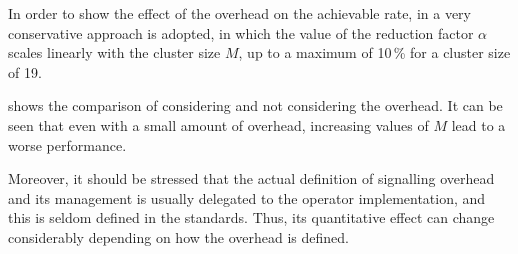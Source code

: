 In order to show the effect of the overhead on the achievable rate, in
 a very conservative approach is adopted, in which the value of the reduction factor $\alpha$ scales linearly with the cluster size
$M$, up to a maximum of 10\,\% for a cluster size of 19.

 shows the comparison of considering and not
considering the overhead. It can be seen that even with a small amount of
overhead, increasing values of $M$ lead to a worse performance.

Moreover, it should be stressed that the actual definition of signalling
overhead and its management is usually delegated to the operator implementation,
and this is seldom defined in the standards. Thus, its quantitative effect can
change considerably depending on how the overhead is defined.





